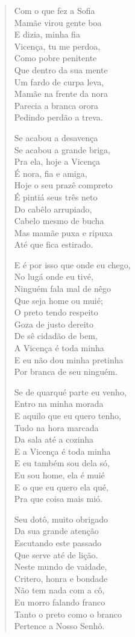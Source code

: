 \begin{verse}
Com o que fez a Sofia\\
Mamãe virou gente boa\\
E dizia, minha fia\\
Vicença, tu me perdoa,\\
Como pobre penitente\\
Que dentro da sua mente\\
Um fardo de curpa leva,\\
Mamãe na frente da nora\\
Parecia a branca orora\\
Pedindo perdão a treva.

Se acabou a desavença\\
Se acabou a grande briga,\\
Pra ela, hoje a Vicença\\
É nora, fia e amiga,\\
Hoje o seu prazê compreto\\
É pintiá seus três neto\\
Do cabêlo arrupiado,\\
Cabelo mesmo de bucha\\
Mas mamãe puxa e ripuxa\\
Até que fica estirado.

E é por isso que onde eu chego,\\
No lugá onde eu tivé,\\
Ninguém fala mal de nêgo\\
Que seja home ou muié;\\
O preto tendo respeito\\
Goza de justo dereito\\
De sê cidadão de bem,\\
A Vicença é toda minha\\
E eu não dou minha pretinha\\
Por branca de seu ninguém.

Se de quarqué parte eu venho,\\
Entro na minha morada\\
E aquilo que eu quero tenho,\\
Tudo na hora marcada\\
Da sala até a cozinha\\
E a Vicença é toda minha\\
E eu também sou dela só,\\
Eu sou home, ela é muié\\
E o que eu quero ela qué,\\
Pra que coisa mais mió.

Seu dotô, muito obrigado\\
Da sua grande atenção\\
Escutando este passado\\
Que serve até de lição.\\
Neste mundo de vaidade,\\
Critero, honra e bondade\\
Não tem nada com a cô,\\
Eu morro falando franco\\
Tanto o preto como o branco\\
Pertence a Nosso Senhô.
\end{verse}

